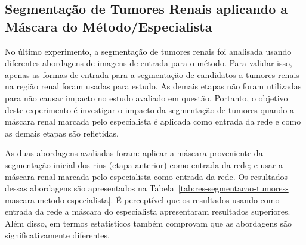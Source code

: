 \subsection{Segmentação de Tumores Renais aplicando a Máscara do Método/Especialista}
\label{sec:segmentacao-tumores-mascara-metodo-especialista}

No último experimento, a segmentação de tumores renais foi analisada usando diferentes abordagens de imagens de entrada para o método. Para validar isso, apenas as formas de entrada para a segmentação de candidatos a tumores renais na região renal foram usadas para estudo. As demais etapas não foram utilizadas para não causar impacto no estudo avaliado em questão. Portanto, o objetivo deste experimento é investigar o impacto da segmentação de tumores quando a máscara renal marcada pelo especialista é aplicada como entrada da rede e como as demais etapas são refletidas.

\begin{table}[!ht]
\caption{Resultados da segmentação de tumores renais aplicando a máscara do método e do especialista.}
\label{tab:res-segmentacao-tumores-mascara-metodo-especialista}
\centering
\onehalfspacing
{}
\end{table}

As duas abordagens avaliadas foram: aplicar a máscara proveniente da segmentação inicial dos rins (etapa anterior) como entrada da rede; e usar a máscara renal marcada pelo especialista como entrada da rede. Os resultados dessas abordagens são apresentados na Tabela~\ref{tab:res-segmentacao-tumores-mascara-metodo-especialista}. É perceptível que os resultados usando como entrada da rede a máscara do especialista apresentaram resultados superiores. Além disso, em termos estatísticos também comprovam que as abordagens são significativamente diferentes.

